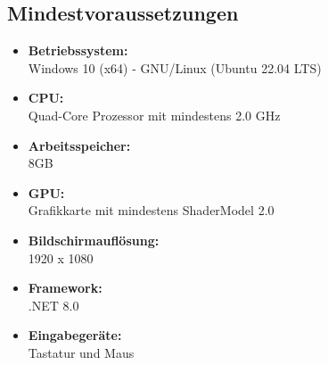 \subsection{Mindestvoraussetzungen}\label{subsec:mindestvoraussetzungen}

\begin{itemize}
    \item \textbf{Betriebssystem:} \\
    Windows 10 (x64) - GNU/Linux (Ubuntu 22.04 LTS)
    \item \textbf{CPU:} \\
    Quad-Core Prozessor mit mindestens 2.0 GHz
    \item \textbf{Arbeitsspeicher:} \\
    8GB
    \item \textbf{GPU:} \\
    Grafikkarte mit mindestens ShaderModel 2.0
    \item \textbf{Bildschirmauflösung:} \\
    1920 x 1080
    \item \textbf{Framework:} \\
    .NET 8.0
    \item \textbf{Eingabegeräte:} \\
    Tastatur und Maus
\end{itemize}

